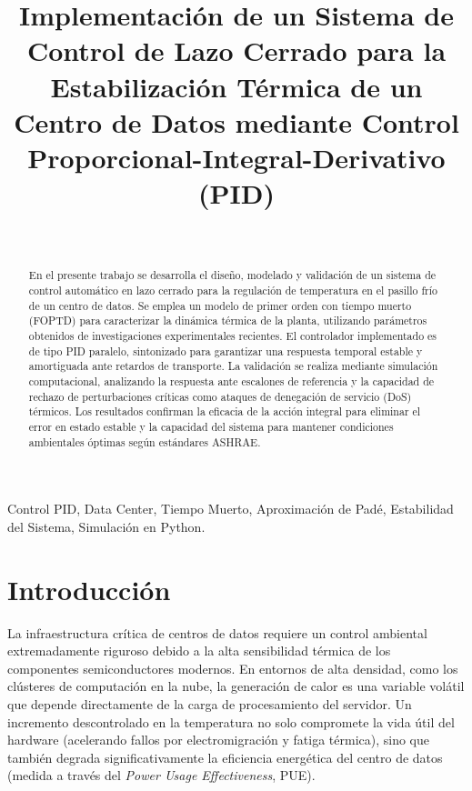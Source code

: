 \documentclass[journal,twocolumn]{IEEEtran}
\title{Implementación de un Sistema de Control de Lazo Cerrado para la Estabilización Térmica de un Centro de Datos mediante Control Proporcional-Integral-Derivativo (PID)}
\author{
    \IEEEauthorblockN{Matias Ezequiel Pormi} \\
    \IEEEauthorblockA{Facultad Regional Buenos Aires, Universidad Tecnológica Nacional \\
    Comisión: K-4011 \\
    Profesor: Ing. Omar Oscár Civale \\
    Fecha: Julio de 2026}
}
\begin{document}
\maketitle

\begin{abstract}
En el presente trabajo se desarrolla el diseño, modelado y validación de un sistema de control automático en lazo cerrado para la regulación de temperatura en el pasillo frío de un centro de datos. Se emplea un modelo de primer orden con tiempo muerto (FOPTD) para caracterizar la dinámica térmica de la planta, utilizando parámetros obtenidos de investigaciones experimentales recientes. El controlador implementado es de tipo PID paralelo, sintonizado para garantizar una respuesta temporal estable y amortiguada ante retardos de transporte. La validación se realiza mediante simulación computacional, analizando la respuesta ante escalones de referencia y la capacidad de rechazo de perturbaciones críticas como ataques de denegación de servicio (DoS) térmicos. Los resultados confirman la eficacia de la acción integral para eliminar el error en estado estable y la capacidad del sistema para mantener condiciones ambientales óptimas según estándares ASHRAE.
\end{abstract}

\begin{IEEEkeywords}
Control PID, Data Center, Tiempo Muerto, Aproximación de Padé, Estabilidad del Sistema, Simulación en Python.
\end{IEEEkeywords}

\tableofcontents
\vspace{1em}

\section{Introducción}
La infraestructura crítica de centros de datos requiere un control ambiental extremadamente riguroso debido a la alta sensibilidad térmica de los componentes semiconductores modernos. En entornos de alta densidad, como los clústeres de computación en la nube, la generación de calor es una variable volátil que depende directamente de la carga de procesamiento del servidor. Un incremento descontrolado en la temperatura no solo compromete la vida útil del hardware (acelerando fallos por electromigración y fatiga térmica), sino que también degrada significativamente la eficiencia energética del centro de datos (medida a través del \textit{Power Usage Effectiveness}, PUE).
\end{document}
